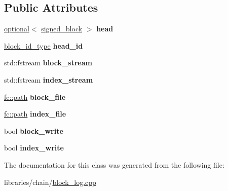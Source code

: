 \subsection*{Public Attributes}
\begin{DoxyCompactItemize}
\item 
\mbox{\label{classaacio_1_1chain_1_1detail_1_1block__log__impl_a6a684c8110801a03f8c424bd603b10f3}} 
\mbox{\hyperlink{classfc_1_1optional}{optional}}$<$ \mbox{\hyperlink{structaacio_1_1chain_1_1signed__block}{signed\+\_\+block}} $>$ {\bfseries head}
\item 
\mbox{\label{classaacio_1_1chain_1_1detail_1_1block__log__impl_a803f23553690d998524c42118e10e42e}} 
\mbox{\hyperlink{classfc_1_1sha256}{block\+\_\+id\+\_\+type}} {\bfseries head\+\_\+id}
\item 
\mbox{\label{classaacio_1_1chain_1_1detail_1_1block__log__impl_af165f58a69a2f3595b0741ac889524dd}} 
std\+::fstream {\bfseries block\+\_\+stream}
\item 
\mbox{\label{classaacio_1_1chain_1_1detail_1_1block__log__impl_a74084b687e2208d8164c88823ccdc0b7}} 
std\+::fstream {\bfseries index\+\_\+stream}
\item 
\mbox{\label{classaacio_1_1chain_1_1detail_1_1block__log__impl_a08d0f7e09ac34037c17024cc054144a1}} 
\mbox{\hyperlink{classfc_1_1path}{fc\+::path}} {\bfseries block\+\_\+file}
\item 
\mbox{\label{classaacio_1_1chain_1_1detail_1_1block__log__impl_aa6bbd2051e74d75918efd140857b5af8}} 
\mbox{\hyperlink{classfc_1_1path}{fc\+::path}} {\bfseries index\+\_\+file}
\item 
\mbox{\label{classaacio_1_1chain_1_1detail_1_1block__log__impl_a5bfb31fb3be9312fb51a46f7fba5dd43}} 
bool {\bfseries block\+\_\+write}
\item 
\mbox{\label{classaacio_1_1chain_1_1detail_1_1block__log__impl_a6f263f979767334d2e7accf8c1e2ff7b}} 
bool {\bfseries index\+\_\+write}
\end{DoxyCompactItemize}


The documentation for this class was generated from the following file\+:\begin{DoxyCompactItemize}
\item 
libraries/chain/\mbox{\hyperlink{block__log_8cpp}{block\+\_\+log.\+cpp}}\end{DoxyCompactItemize}
